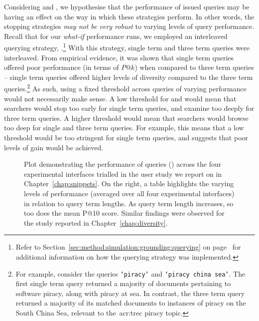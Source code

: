 Considering  and , we hypothesise that the performance of issued queries may be having an effect on the way in which these strategies perform. In other words, the stopping strategies \emph{may not be very robust} to varying levels of query performance. Recall that for our \emph{what-if} performance runs, we employed an interleaved querying strategy, .\footnote{Refer to Section~\ref{sec:method:simulation:grounding:querying} on page~\pageref{sec:method:simulation:grounding:querying} for additional information on how the querying strategy was implemented.} With this strategy, single term and three term queries were interleaved. From empirical evidence, it was shown that single term queries offered poor performance (in terms of $P@k$) when compared to three term queries -- single term queries offered higher levels of diversity compared to the three term queries.\footnote{For example, consider the queries \texttt{`piracy'} and \texttt{`piracy china sea'}. The first single term query returned a majority of documents pertaining to software piracy, along with piracy at sea. In contrast, the three term query returned a majority of its matched documents to instances of piracy on the South China Sea, relevant to the~\gls{acr:trec} piracy topic.} As such, using a fixed threshold across queries of varying performance would not necessarily make sense. A low threshold for  and  would mean that searchers would stop too early for single term queries, and examine too deeply for three term queries. A higher threshold would mean that searchers would browse too deep for single and three term queries. For example, this means that a low threshold would be too stringent for single term queries, and suggests that poor levels of gain would be achieved.

\begin{figure}[t!]
    \centering
    \caption[Query performance by real-world subjects]{Plot demonstrating the performance of queries () across the four experimental interfaces trialled in the user study we report on in Chapter~\ref{chap:snippets}. On the right, a table highlights the varying levels of performance (averaged over all four experimental interfaces) in relation to query term lengths. As query term length increases, so too does the mean P@10 score. Similar findings were observed for the study reported in Chapter~\ref{chap:diversity}.}
    \label{fig:query_performance_ch7}
\end{figure}

